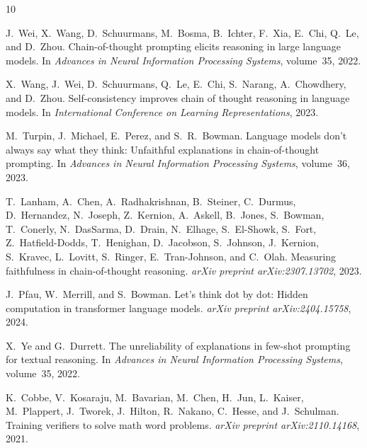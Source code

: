 \documentclass{article}
\theoremstyle{definition}
\theoremstyle{definition}
\begin{document}

\begin{thebibliography}{10}

J.~Wei, X.~Wang, D.~Schuurmans, M.~Bosma, B.~Ichter, F.~Xia, E.~Chi,
  Q.~Le, and D.~Zhou.
\newblock Chain-of-thought prompting elicits reasoning in large language
  models.
\newblock In \emph{Advances in Neural Information Processing Systems},
  volume~35, 2022.

X.~Wang, J.~Wei, D.~Schuurmans, Q.~Le, E.~Chi, S.~Narang, A.~Chowdhery,
  and D.~Zhou.
\newblock Self-consistency improves chain of thought reasoning in language
  models.
\newblock In \emph{International Conference on Learning Representations}, 2023.

M.~Turpin, J.~Michael, E.~Perez, and S.~R.~Bowman.
\newblock Language models don't always say what they think: Unfaithful
  explanations in chain-of-thought prompting.
\newblock In \emph{Advances in Neural Information Processing Systems},
  volume~36, 2023.

T.~Lanham, A.~Chen, A.~Radhakrishnan, B.~Steiner, C.~Durmus,
  D.~Hernandez, N.~Joseph, Z.~Kernion, A.~Askell, B.~Jones, S.~Bowman,
  T.~Conerly, N.~DasSarma, D.~Drain, N.~Elhage, S.~El-Showk, S.~Fort,
  Z.~Hatfield-Dodds, T.~Henighan, D.~Jacobson, S.~Johnson, J.~Kernion,
  S.~Kravec, L.~Lovitt, S.~Ringer, E.~Tran-Johnson, and C.~Olah.
\newblock Measuring faithfulness in chain-of-thought reasoning.
\newblock \emph{arXiv preprint arXiv:2307.13702}, 2023.

J.~Pfau, W.~Merrill, and S.~Bowman.
\newblock Let's think dot by dot: Hidden computation in transformer language
  models.
\newblock \emph{arXiv preprint arXiv:2404.15758}, 2024.

X.~Ye and G.~Durrett.
\newblock The unreliability of explanations in few-shot prompting for textual
  reasoning.
\newblock In \emph{Advances in Neural Information Processing Systems},
  volume~35, 2022.

K.~Cobbe, V.~Kosaraju, M.~Bavarian, M.~Chen, H.~Jun, L.~Kaiser,
  M.~Plappert, J.~Tworek, J.~Hilton, R.~Nakano, C.~Hesse, and J.~Schulman.
\newblock Training verifiers to solve math word problems.
\newblock \emph{arXiv preprint arXiv:2110.14168}, 2021.


\end{thebibliography}
\end{document}
